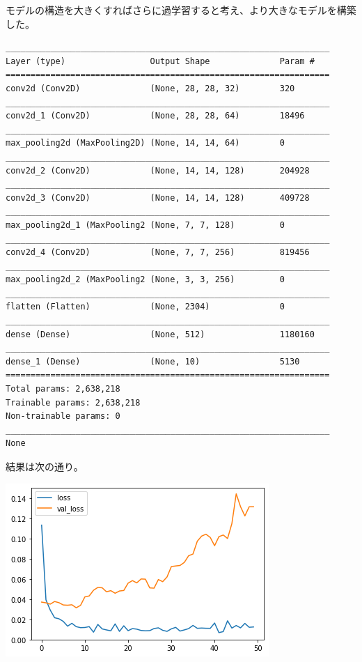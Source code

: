 \documentclass[platex,dvipdfmx]{jsarticle}
\begin{document}
モデルの構造を大きくすればさらに過学習すると考え、より大きなモデルを構築した。

\begin{lstlisting}
_________________________________________________________________
Layer (type)                 Output Shape              Param #   
=================================================================
conv2d (Conv2D)              (None, 28, 28, 32)        320       
_________________________________________________________________
conv2d_1 (Conv2D)            (None, 28, 28, 64)        18496     
_________________________________________________________________
max_pooling2d (MaxPooling2D) (None, 14, 14, 64)        0         
_________________________________________________________________
conv2d_2 (Conv2D)            (None, 14, 14, 128)       204928    
_________________________________________________________________
conv2d_3 (Conv2D)            (None, 14, 14, 128)       409728    
_________________________________________________________________
max_pooling2d_1 (MaxPooling2 (None, 7, 7, 128)         0         
_________________________________________________________________
conv2d_4 (Conv2D)            (None, 7, 7, 256)         819456    
_________________________________________________________________
max_pooling2d_2 (MaxPooling2 (None, 3, 3, 256)         0         
_________________________________________________________________
flatten (Flatten)            (None, 2304)              0         
_________________________________________________________________
dense (Dense)                (None, 512)               1180160   
_________________________________________________________________
dense_1 (Dense)              (None, 10)                5130      
=================================================================
Total params: 2,638,218
Trainable params: 2,638,218
Non-trainable params: 0
_________________________________________________________________
None
\end{lstlisting}

結果は次の通り。

\includegraphics[width=10cm]{b1101.png}
\end{document}
